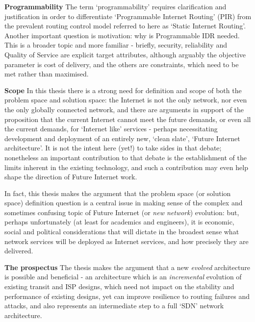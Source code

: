
\textbf{Programmability} The term ‘programmability’ requires clarification and justification in order to differentiate ‘Programmable Internet Routing’ (PIR) from the prevalent routing control model referred to here as ‘Static Internet Routing’.
Another important question is motivation: why is Programmable IDR 
needed.
This is a broader topic and more familiar - briefly, security, reliability and Quality of Service are explicit target attributes, although arguably the objective parameter is cost of delivery, and the others are constraints, which need to be met rather than maximised.
\medskip

\textbf{Scope} In this thesis there is a strong need for definition and scope of both the problem space and solution space: the Internet is not the only network, nor even the only globally connected network, and there are arguments in support of the proposition that the current Internet cannot meet the future demands, or even all the current demands, for ‘Internet like’ services - perhaps necessitating development and deployment of an entirely new, ‘clean slate’, ‘Future Internet architecture’.
It is not the intent here (yet!) to take sides in that debate; nonetheless an important contribution to that debate is the establishment of the limits inherent in the existing technology, and such a contribution may even help shape the direction of Future Internet work.

In fact, this thesis makes the argument that the problem space (or solution space) definition question is a central issue in making sense of the complex and sometimes confusing topic of Future Internet (or \emph{new network}) evolution: but, perhaps unfortunately (at least for academics and engineers), it is economic, social and political considerations that will dictate in the broadest sense what network services will be deployed as Internet services, and how precisely they are delivered.
\medskip

\textbf{The prospectus}
The thesis makes the argument that a new \emph{evolved} architecture is possible and beneficial - an architecture which is an \emph{incremental} evolution of existing transit and ISP designs,
which need not impact on the stability and performance of existing designs, yet can improve resilience to routing failures and attacks, and also represents an intermediate step to a full ‘SDN’ network architecture.
\medskip

